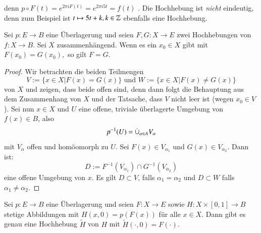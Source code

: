 \documentclass[a4paper,10pt]{scrartcl}
\begin{document}
\begin{figure}[H]
\centering
 \fixme[fig39]
\caption{}
\end{figure}

denn $p\circ F(t)=e^{2\pi i F(t)}=e^{2\pi i 5 t}=f(t)$ . Die Hochhebung ist \emph{nicht} eindeutig, denn zum Beispiel ist
$t\mapsto 5t+k, k\in \mathbb{Z}$  ebenfalls eine Hochhebung.
\begin{st}\label{thm2:2.3}
Sei $p: E \to B$ eine Überlagerung und seien $F,G: X\to E$ zwei Hochhebungen von $f:X\to B$. Sei $X$ zusammenhängend. Wenn es ein $x_0 \in X$ gibt mit $F(x_0)=G(x_0),$ so gilt $F=G$. 
\end{st}
\begin{proof}
 Wir betrachten die beiden Teilmengen
\[
 V:=\{x\in X|F(x) = G(x)\} \text{ und } W:=\{x\in X|F(x)\neq G(x)\}
\]
von $X$ und zeigen, dass beide offen sind, denn dann folgt die Behauptung aus dem Zusammenhang von $X$ und der Tatsache, dass $V$ nicht leer ist (wegen $x_0\in V$). Sei nun $x\in X$ und $U$ eine offene, triviale überlagerte Umgebung von $f(x)\in B$, also
\[
 p^{-1}(U)=\mathbin{\dot{\cup}}_{\alpha\in A} V_\alpha
\]
mit $V_\alpha$ offen und homöomorph zu $U$. Sei $F(x)\in V_{\alpha_1}$ und $G(x)\in V_{\alpha_2}$. Dann ist:
\[
 D:=F^{-1}(V_{\alpha_1})\cap G^{-1}(V_{\alpha_2})
\]
eine offene Umgebung von $x$. Es gilt $D\subset V$, falls $\alpha_1=\alpha_2$ und $D\subset W$ falls $\alpha_1\neq \alpha_2$.
\end{proof}
\begin{st} \label{thm2:2.4}
 Sei $p: E\to B$ eine Überlagerung und seien $F: X \to E$ sowie $H: X\times [0,1] \to B$ stetige Abbildungen mit $H(x,0)=p(F(x))$ für alle $x\in X$. Dann gibt es genau eine Hochhebung $\tilde H$ von $H$ mit $\tilde H(\cdot, 0)=F(\cdot)$.
\end{st}
\end{document}
